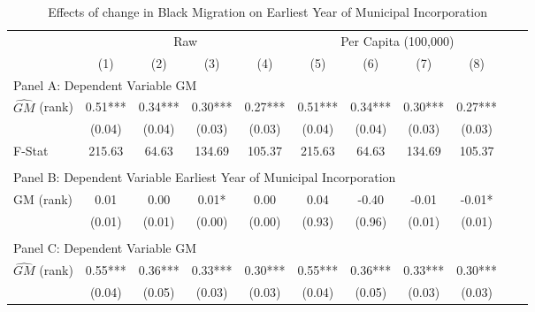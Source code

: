  \begin{table}[htbp]\centering {} \begin{threeparttable} \caption{Effects of change in Black Migration on Earliest Year of Municipal Incorporation} \begin{tabular}{l*{10}{c}} \toprule
                &\multicolumn{4}{c}{Raw}                                    &\multicolumn{4}{c}{Per Capita (100,000)}                   \\\cmidrule(lr){2-5}\cmidrule(lr){6-9}
                &\multicolumn{1}{c}{(1)}   &\multicolumn{1}{c}{(2)}   &\multicolumn{1}{c}{(3)}   &\multicolumn{1}{c}{(4)}   &\multicolumn{1}{c}{(5)}   &\multicolumn{1}{c}{(6)}   &\multicolumn{1}{c}{(7)}   &\multicolumn{1}{c}{(8)}   \\
\cmidrule(lr){1-9}
\multicolumn{8}{l}{Panel A: Dependent Variable GM}\\
\cmidrule(lr){1-9}
$\hat{GM}$ (rank)&       0.51***&       0.34***&       0.30***&       0.27***&       0.51***&       0.34***&       0.30***&       0.27***\\
                &     (0.04)   &     (0.04)   &     (0.03)   &     (0.03)   &     (0.04)   &     (0.04)   &     (0.03)   &     (0.03)   \\
\midrule
F-Stat          &     215.63   &      64.63   &     134.69   &     105.37   &     215.63   &      64.63   &     134.69   &     105.37   \\
\cmidrule[\heavyrulewidth](lr){1-9} \\ \cmidrule[\heavyrulewidth](lr){1-9}
\multicolumn{8}{l}{Panel B: Dependent Variable Earliest Year of Municipal Incorporation}\\
\cmidrule(lr){1-9}
GM  (rank)      &       0.01   &       0.00   &       0.01*  &       0.00   &       0.04   &      -0.40   &      -0.01   &      -0.01*  \\
                &     (0.01)   &     (0.01)   &     (0.00)   &     (0.00)   &     (0.93)   &     (0.96)   &     (0.01)   &     (0.01)   \\
\cmidrule[\heavyrulewidth](lr){1-9} \\ \cmidrule[\heavyrulewidth](lr){1-9}
\multicolumn{8}{l}{Panel C: Dependent Variable GM}\\
\cmidrule(lr){1-9}
$\hat{GM}$ (rank)&       0.55***&       0.36***&       0.33***&       0.30***&       0.55***&       0.36***&       0.33***&       0.30***\\
                &     (0.04)   &     (0.05)   &     (0.03)   &     (0.03)   &     (0.04)   &     (0.05)   &     (0.03)   &     (0.03)   \\

\end{tabular}
\end{threeparttable}
\end{table}
